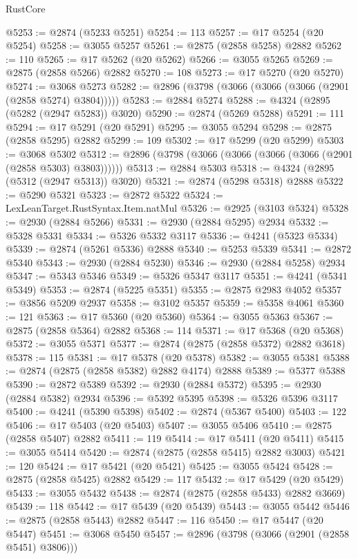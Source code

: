 \begin{lexlean}{RustCore}
\begin{coremodule}
@5253 := @2874 (@5233 @5251)
@5254 := 113
@5257 := @17 @5254 (@20 @5254)
@5258 := @3055 @5257
@5261 := @2875 (@2858 @5258) @2882
@5262 := 110
@5265 := @17 @5262 (@20 @5262)
@5266 := @3055 @5265
@5269 := @2875 (@2858 @5266) @2882
@5270 := 108
@5273 := @17 @5270 (@20 @5270)
@5274 := @3068 @5273
@5282 := @2896 (@3798 (@3066 (@3066 (@3066 (@2901 (@2858 @5274) @3804)))))
@5283 := @2884 @5274
@5288 := @4324 (@2895 (@5282 (@2947 @5283)) @3020)
@5290 := @2874 (@5269 @5288)
@5291 := 111
@5294 := @17 @5291 (@20 @5291)
@5295 := @3055 @5294
@5298 := @2875 (@2858 @5295) @2882
@5299 := 109
@5302 := @17 @5299 (@20 @5299)
@5303 := @3068 @5302
@5312 := @2896 (@3798 (@3066 (@3066 (@3066 (@3066 (@2901 (@2858 @5303) @3803))))))
@5313 := @2884 @5303
@5318 := @4324 (@2895 (@5312 (@2947 @5313)) @3020)
@5321 := @2874 (@5298 @5318) @2888
@5322 := @5290 @5321
@5323 := @2872 @5322
@5324 := LexLeanTarget.RustSyntax.Item.natMul
@5326 := @2925 (@3103 @5324)
@5328 := @2930 (@2884 @5266)
@5331 := @2930 (@2884 @5295) @2934
@5332 := @5328 @5331
@5334 := @5326 @5332 @3117
@5336 := @4241 (@5323 @5334)
@5339 := @2874 (@5261 @5336) @2888
@5340 := @5253 @5339
@5341 := @2872 @5340
@5343 := @2930 (@2884 @5230)
@5346 := @2930 (@2884 @5258) @2934
@5347 := @5343 @5346
@5349 := @5326 @5347 @3117
@5351 := @4241 (@5341 @5349)
@5353 := @2874 (@5225 @5351)
@5355 := @2875 @2983 @4052
@5357 := @3856 @5209 @2937
@5358 := @3102 @5357
@5359 := @5358 @4061
@5360 := 121
@5363 := @17 @5360 (@20 @5360)
@5364 := @3055 @5363
@5367 := @2875 (@2858 @5364) @2882
@5368 := 114
@5371 := @17 @5368 (@20 @5368)
@5372 := @3055 @5371
@5377 := @2874 (@2875 (@2858 @5372) @2882 @3618)
@5378 := 115
@5381 := @17 @5378 (@20 @5378)
@5382 := @3055 @5381
@5388 := @2874 (@2875 (@2858 @5382) @2882 @4174) @2888
@5389 := @5377 @5388
@5390 := @2872 @5389
@5392 := @2930 (@2884 @5372)
@5395 := @2930 (@2884 @5382) @2934
@5396 := @5392 @5395
@5398 := @5326 @5396 @3117
@5400 := @4241 (@5390 @5398)
@5402 := @2874 (@5367 @5400)
@5403 := 122
@5406 := @17 @5403 (@20 @5403)
@5407 := @3055 @5406
@5410 := @2875 (@2858 @5407) @2882
@5411 := 119
@5414 := @17 @5411 (@20 @5411)
@5415 := @3055 @5414
@5420 := @2874 (@2875 (@2858 @5415) @2882 @3003)
@5421 := 120
@5424 := @17 @5421 (@20 @5421)
@5425 := @3055 @5424
@5428 := @2875 (@2858 @5425) @2882
@5429 := 117
@5432 := @17 @5429 (@20 @5429)
@5433 := @3055 @5432
@5438 := @2874 (@2875 (@2858 @5433) @2882 @3669)
@5439 := 118
@5442 := @17 @5439 (@20 @5439)
@5443 := @3055 @5442
@5446 := @2875 (@2858 @5443) @2882
@5447 := 116
@5450 := @17 @5447 (@20 @5447)
@5451 := @3068 @5450
@5457 := @2896 (@3798 (@3066 (@2901 (@2858 @5451) @3806)))

\end{coremodule}
\end{lexlean}
